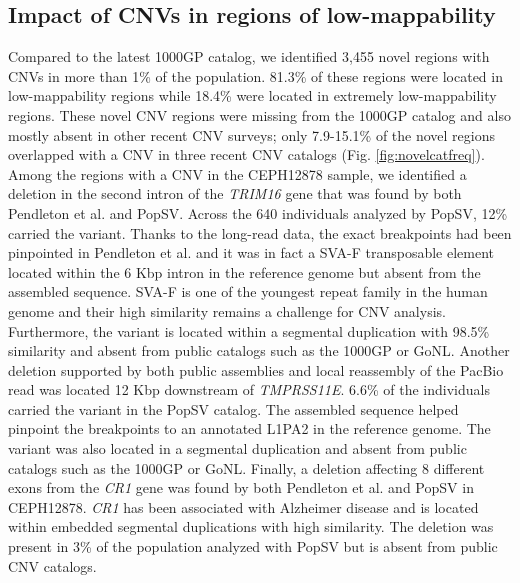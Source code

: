 \subsection*{Impact of CNVs in regions of low-mappability}

Compared to the latest 1000GP catalog\cite{Sudmant2015a}, we identified 3,455 novel regions with CNVs in more than 1\% of the population.
81.3\% of these regions were located in low-mappability regions while 18.4\% were located in extremely low-mappability regions.
These novel CNV regions were missing from the 1000GP catalog and also mostly absent in other recent CNV surveys; only 7.9-15.1\% of the novel regions overlapped with a CNV in three recent CNV catalogs\cite{Handsaker2015,Chiang2017,Francioli2014} (Fig. \ref{fig:novelcatfreq}).
Among the regions with a CNV in the CEPH12878 sample, we identified a deletion in the second intron of the {\it TRIM16} gene that was found by both Pendleton et al.\cite{Pendleton2015} and {\sf PopSV}.
Across the 640 individuals analyzed by {\sf PopSV}, 12\% carried the variant.
Thanks to the long-read data, the exact breakpoints had been pinpointed in Pendleton et al.\cite{Pendleton2015} and it was in fact a SVA-F transposable element located within the 6 Kbp intron in the reference genome but absent from the assembled sequence.
SVA-F is one of the youngest repeat family in the human genome and their high similarity remains a challenge for CNV analysis.
Furthermore, the variant is located within a segmental duplication with 98.5\% similarity and absent from public catalogs such as the 1000GP or GoNL.
Another deletion supported by both public assemblies and local reassembly of the PacBio read was located 12 Kbp downstream of {\it TMPRSS11E}.
6.6\% of the individuals carried the variant in the {\sf PopSV} catalog.
The assembled sequence helped pinpoint the breakpoints to an annotated L1PA2 in the reference genome.
The variant was also located in a segmental duplication and absent from public catalogs such as the 1000GP or GoNL.
Finally, a deletion affecting 8 different exons from the {\it CR1} gene was found by both Pendleton et al.\cite{Pendleton2015} and {\sf PopSV} in CEPH12878.
{\it CR1} has been associated with Alzheimer disease\cite{Lambert2009} and is located within embedded segmental duplications with high similarity.
The deletion was present in 3\% of the population analyzed with {\sf PopSV} but is absent from public CNV catalogs.

